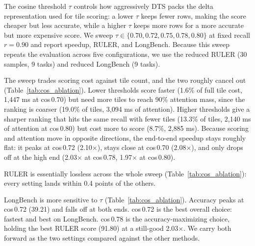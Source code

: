 The cosine threshold $\tau$ controls how aggressively DTS packs the delta representation used for tile scoring: a lower $\tau$ keeps fewer rows, making the score cheaper but less accurate, while a higher $\tau$ keeps more rows for a more accurate but more expensive score. We sweep $\tau \in \{0.70, 0.72, 0.75, 0.78, 0.80\}$ at fixed recall $r{=}0.90$ and report speedup, RULER, and LongBench. Because this sweep repeats the evaluation across five configurations, we use the reduced RULER (30 samples, 9 tasks) and reduced LongBench (9 tasks).

The sweep trades scoring cost against tile count, and the two roughly cancel out (Table~\ref{tab:cos_ablation}). Lower thresholds score faster (1.6\% of full tile cost, 1{,}447 ms at cos\,0.70) but need more tiles to reach 90\% attention mass, since the ranking is coarser (19.0\% of tiles, 3{,}094 ms of attention). Higher thresholds give a sharper ranking that hits the same recall with fewer tiles (13.3\% of tiles, 2{,}140 ms of attention at cos\,0.80) but cost more to score (8.7\%, 2{,}885 ms). Because scoring and attention move in opposite directions, the end-to-end speedup stays roughly flat: it peaks at cos\,0.72 (2.10$\times$), stays close at cos\,0.70 (2.08$\times$), and only drops off at the high end (2.03$\times$ at cos\,0.78, 1.97$\times$ at cos\,0.80).

RULER is essentially lossless across the whole sweep (Table~\ref{tab:cos_ablation}): every setting lands within 0.4 points of the others.

LongBench is more sensitive to $\tau$ (Table~\ref{tab:cos_ablation}). Accuracy peaks at cos\,0.72 (39.21) and falls off at both ends. cos\,0.72 is the best overall choice: fastest and best on LongBench. cos\,0.78 is the accuracy-maximizing choice, holding the best RULER score (91.80) at a still-good 2.03$\times$. We carry both forward as the two settings compared against the other methods.

